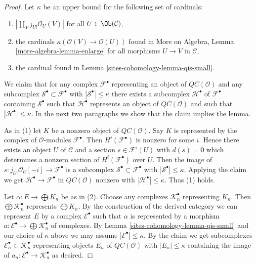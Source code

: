 \begin{proof}
Let $\kappa$ be an upper bound for the following set of cardinals:
\begin{enumerate}
\item $|\coprod_V j_{U!}\mathcal{O}_U(V)|$ for all $U \in \Ob(\mathcal{C})$,
\item the cardinals $\kappa(\mathcal{O}(V) \to \mathcal{O}(U))$
found in More on Algebra, Lemma \ref{more-algebra-lemma-enlarge}
for all morphisms $U \to V$ in $\mathcal{C}$,
\item the cardinal found in Lemma \ref{sites-cohomology-lemma-qis-small}.
\end{enumerate}
We claim that for any complex $\mathcal{F}^\bullet$ representing an object of
$\mathit{QC}(\mathcal{O})$ and any subcomplex
$\mathcal{S}^\bullet \subset \mathcal{F}^\bullet$
with $|\mathcal{S}^\bullet| \leq \kappa$ there exists a subcomplex
$\mathcal{H}^\bullet$ of $\mathcal{F}^\bullet$ containing $\mathcal{S}^\bullet$
such that $\mathcal{H}^\bullet$ represents an object of
$\mathit{QC}(\mathcal{O})$
and such that $|\mathcal{H}^\bullet| \leq \kappa$.
In the next two paragraphs we show that the claim implies the lemma.

\medskip\noindent
As in (1) let $K$ be a nonzero object of $\mathit{QC}(\mathcal{O})$.
Say $K$ is represented by the complex
of $\mathcal{O}$-modules $\mathcal{F}^\bullet$. Then $H^i(\mathcal{F}^\bullet)$
is nonzero for some $i$. Hence there exists an object $U$ of $\mathcal{C}$
and a section $s \in \mathcal{F}^i(U)$ with $d(s) = 0$ which determines a
nonzero section of $H^i(\mathcal{F}^\bullet)$ over $U$. Then the image
of $s : j_{U!}\mathcal{O}_U[-i] \to \mathcal{F}^\bullet$ is a subcomplex
$\mathcal{S}^\bullet \subset \mathcal{F}^\bullet$ with
$|\mathcal{S}^\bullet| \leq \kappa$. Applying the claim we get
$\mathcal{H}^\bullet \to \mathcal{F}^\bullet$ in
$\mathit{QC}(\mathcal{O})$ nonzero
with $|\mathcal{H}^\bullet| \leq \kappa$. Thus (1) holds.

\medskip\noindent
Let $\alpha : E \to \bigoplus K_n$ be as in (2).
Choose any complexes $\mathcal{K}_n^\bullet$ representing $K_n$.
Then $\bigoplus \mathcal{K}_n^\bullet$ represents $\bigoplus K_n$.
By the construction of the derived category we can represent
$E$ by a complex $\mathcal{E}^\bullet$ such that $\alpha$
is represented by a morphism
$a : \mathcal{E}^\bullet \to \bigoplus \mathcal{K}_n^\bullet$
of complexes. By Lemma \ref{sites-cohomology-lemma-qis-small} and our choice of
$\kappa$ above we may assume
$|\mathcal{E}^\bullet| \leq \kappa$. By the claim
we get subcomplexes $\mathcal{E}_n^\bullet \subset \mathcal{K}_n^\bullet$
representing objects $E_n$ of
$\mathit{QC}(\mathcal{O})$ with $|E_n| \leq \kappa$
containing the image of $a_n : \mathcal{E}^\bullet \to \mathcal{K}_n^\bullet$
as desired.


\end{proof}
